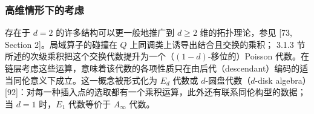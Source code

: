 \subsubsection{高维情形下的考虑}
存在于 $d=2$ 的许多结构可以更一般地推广到 $d\geq2$ 维的拓扑理论，参见 [73, Section 2]。局域算子的碰撞在 $Q$ 上同调类上诱导出结合且交换的乘积；
3.1.3 节所述的次级乘积把这个交换代数提升为一个（$(1-d)$-移位的）Poisson 代数。在链层考虑这些运算，意味着该代数的各项性质只在由后代（descendant）编码的适当同伦意义下成立。这一概念被形式化为 $E_d$ 代数或 $d$-圆盘代数（$d$-disk algebra）[92]：对每一种插入点的选取都有一个乘积运算，此外还有联系同伦构型的数据；当 $d=1$ 时，$E_1$ 代数等价于 $A_\infty$ 代数。

